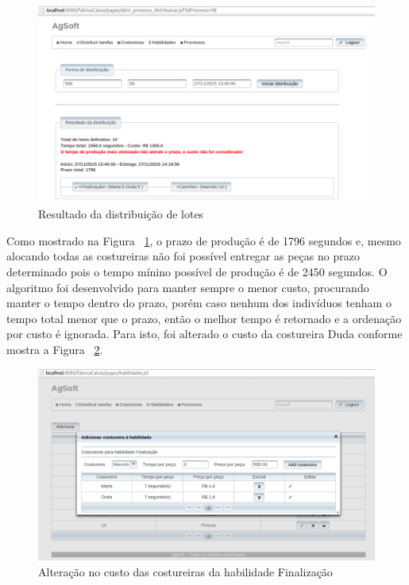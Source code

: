 \begin{figure}[h!]
	\centerline{\includegraphics[scale=0.3]{./imagens/resultado1_teste6.png}}
	\caption[Resultado da distribuição de lotes] 
	{Resultado da distribuição de lotes}
	\label{fig:resultado1_teste6}
\end{figure}

\par Como mostrado na Figura ~\ref{fig:resultado1_teste6}, o prazo de produção
é de 1796 segundos e, mesmo alocando todas as costureiras não foi possível
entregar as peças no prazo determinado pois o tempo mínino possível de produção
é de 2450 segundos. O algoritmo foi desenvolvido para manter sempre o menor custo, procurando manter o tempo
dentro do prazo, porém caso nenhum dos indivíduos tenham o tempo total menor que o prazo,
então o melhor tempo é retornado e a ordenação por custo é ignorada. Para isto,
foi alterado o custo da costureira Duda conforme mostra a Figura
~\ref{fig:alterecao_custo_teste6}.
  
\begin{figure}[h!]
	\centerline{\includegraphics[scale=0.3]{./imagens/alterecao_custo_teste6.png}}
	\caption[Alteração no custo das costureiras da habilidade Finalização] 
	{Alteração no custo das costureiras da habilidade Finalização}
	\label{fig:alterecao_custo_teste6}
\end{figure}

